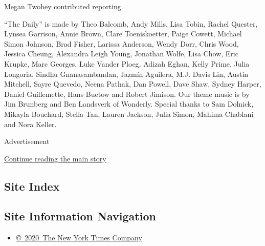 Megan Twohey contributed reporting.

``The Daily'' is made by Theo Balcomb, Andy Mills, Lisa Tobin, Rachel
Quester, Lynsea Garrison, Annie Brown, Clare Toeniskoetter, Paige
Cowett, Michael Simon Johnson, Brad Fisher, Larissa Anderson, Wendy
Dorr, Chris Wood, Jessica Cheung, Alexandra Leigh Young, Jonathan Wolfe,
Lisa Chow, Eric Krupke, Marc Georges, Luke Vander Ploeg, Adizah Eghan,
Kelly Prime, Julia Longoria, Sindhu Gnanasambandan, Jazmín Aguilera,
M.J. Davis Lin, Austin Mitchell, Sayre Quevedo, Neena Pathak, Dan
Powell, Dave Shaw, Sydney Harper, Daniel Guillemette, Hans Buetow and
Robert Jimison. Our theme music is by Jim Brunberg and Ben Landsverk of
Wonderly. Special thanks to Sam Dolnick, Mikayla Bouchard, Stella Tan,
Lauren Jackson, Julia Simon, Mahima Chablani and Nora Keller.

Advertisement

\protect\hyperlink{after-bottom}{Continue reading the main story}

\hypertarget{site-index}{%
\subsection{Site Index}\label{site-index}}

\hypertarget{site-information-navigation}{%
\subsection{Site Information
Navigation}\label{site-information-navigation}}

\begin{itemize}
\tightlist
\item
  \href{https://help.nytimes.com/hc/en-us/articles/115014792127-Copyright-notice}{©~2020~The
  New York Times Company}
\end{itemize}

